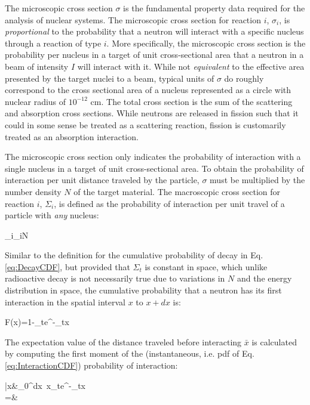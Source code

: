 The microscopic cross section \(\sigma\) is the fundamental property data required for the analysis of nuclear systems. The microscopic cross section for reaction \(i\), \(\sigma_i\), is {\it proportional} to the probability that a neutron will interact with a specific nucleus through a reaction of type \(i\). More specifically, the microscopic cross section is the probability per nucleus in a target of unit cross-sectional area that a neutron in a beam of intensity \(I\) will interact with it. While not {\it equivalent} to the effective area presented by the target nuclei to a beam, typical units of \(\sigma\) do roughly correspond to the cross sectional area of a nucleus represented as a circle with nuclear radius of \(10^{-12}\) cm. The total cross section is the sum of the scattering and absorption cross sections. While neutrons are released in fission such that it could in some sense be treated as a scattering reaction, fission is customarily treated as an absorption interaction.

The microscopic cross section only indicates the probability of interaction with a single nucleus in a target of unit cross-sectional area. To obtain the probability of interaction per unit distance traveled by the particle, \(\sigma\) must be multiplied by the number density \(N\) of the target material. The macroscopic cross section for reaction \(i\), \(\Sigma_i\), is defined as the probability of interaction per unit travel of a particle with {\it any} nucleus:

\beq
\label{eq:MacroscopicSigmaDef}
\Sigma_i\equiv\sigma_iN
\eeq

Similar to the definition for the cumulative probability of decay in Eq. \eqref{eq:DecayCDF}, but provided that \(\Sigma_t\) is constant in space, which unlike radioactive decay is not necessarily true due to variations in \(N\) and the energy distribution in space, the cumulative probability that a neutron has its first interaction in the spatial interval \(x\) to \(x+dx\) is:

\beq
\label{eq:InteractionCDF}
F(x)=1-\Sigma_te^{-\Sigma_tx}
\eeq

The expectation value of the distance traveled before interacting \(\bar{x}\) is calculated by computing the first moment of the (instantaneous, i.e. \gls{pdf} of Eq. \eqref{eq:InteractionCDF}) probability of interaction:

\beqa
\bar{x}\equiv&\int_0^\infty dx\ x\Sigma_te^{-\Sigma_tx}\\
=&\ 
\eeqa

